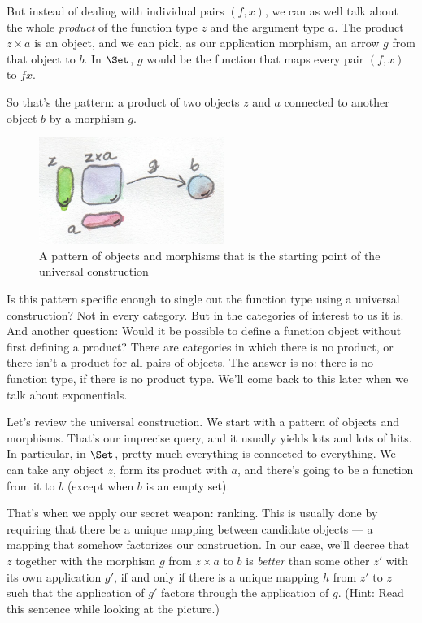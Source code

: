 But instead of dealing with individual pairs $(f, x)$, we can as
well talk about the whole \emph{product} of the function type $z$
and the argument type $a$. The product $z\times{}a$ is an object,
and we can pick, as our application morphism, an arrow $g$ from
that object to $b$. In $\Set$, $g$ would be the
function that maps every pair $(f, x)$ to $f x$.

So that's the pattern: a product of two objects $z$ and
$a$ connected to another object $b$ by a morphism $g$.

\begin{figure}
\centering
\includegraphics[width=60mm]{images/functionpattern.jpg}
\caption{A pattern of objects and morphisms that is the starting point of the
universal construction}
\end{figure}

Is this pattern specific enough to single out the function type using a
universal construction? Not in every category. But in the categories of
interest to us it is. And another question: Would it be possible to
define a function object without first defining a product? There are
categories in which there is no product, or there isn't a product for
all pairs of objects. The answer is no: there is no function type, if
there is no product type. We'll come back to this later when we talk
about exponentials.

Let's review the universal construction. We start with a pattern of
objects and morphisms. That's our imprecise query, and it usually yields
lots and lots of hits. In particular, in $\Set$, pretty much
everything is connected to everything. We can take any object
$z$, form its product with $a$, and there's going to be a
function from it to $b$ (except when $b$ is an empty set).

That's when we apply our secret weapon: ranking. This is usually done by
requiring that there be a unique mapping between candidate objects --- a
mapping that somehow factorizes our construction. In our case, we'll
decree that $z$ together with the morphism $g$ from
$z \times a$ to $b$ is \emph{better} than some other
$z'$ with its own application $g'$, if and
only if there is a unique mapping $h$ from $z'$ to
$z$ such that the application of $g'$ factors
through the application of $g$. (Hint: Read this sentence while
looking at the picture.)

